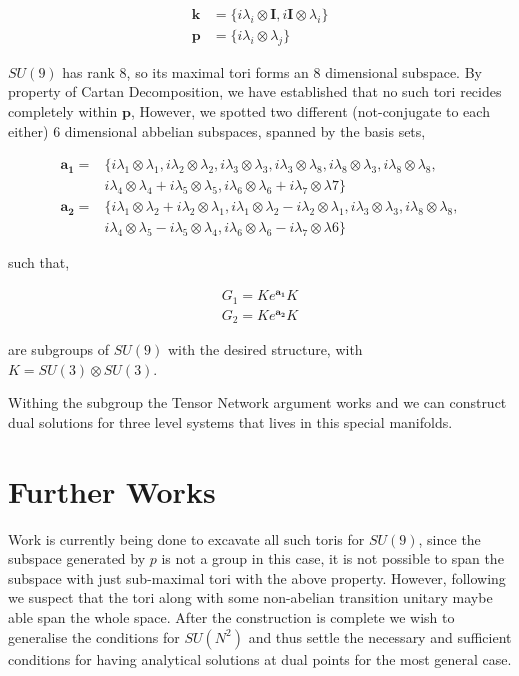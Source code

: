 \documentclass{amsart}
\begin{document}
\begin{align*}
    \mathbf{k}&=\{i \lambda_i \otimes \mathbf{I}, i \mathbf{I} \otimes\lambda_i \}\\
    \mathbf{p}&=\{i \lambda_i \otimes \lambda_j \}
\end{align*}

$SU(9)$ has rank 8, so its maximal tori forms an 8 dimensional subspace. By property of Cartan Decomposition, we have established that no such tori recides completely within $\mathbf{p}$, However, we spotted two different (not-conjugate to each either) 6 dimensional abbelian subspaces, spanned by the basis sets,

\begin{align*}
    \mathbf{a_1}=&\{i \lambda_1 \otimes \lambda_1 ,i \lambda_2 \otimes \lambda_2 ,i \lambda_3 \otimes \lambda_3 , i \lambda_3 \otimes \lambda_8, i \lambda_8 \otimes \lambda_3 , i \lambda_8 \otimes \lambda_8 ,
    \\&i \lambda_4 \otimes \lambda_4 +i \lambda_5 \otimes \lambda_5 ,i \lambda_6 \otimes \lambda_6 +i \lambda_7 \otimes \lambda7  \} \\
    \mathbf{a_2}=&\{i \lambda_1 \otimes \lambda_2+i \lambda_2 \otimes \lambda_1 , i \lambda_1 \otimes \lambda_2 -i \lambda_2 \otimes \lambda_1,i \lambda_3 \otimes \lambda_3 , i \lambda_8 \otimes \lambda_8 ,\\&
    i \lambda_4 \otimes \lambda_5 -i \lambda_5 \otimes \lambda_4 ,i \lambda_6 \otimes \lambda_6 -i \lambda_7 \otimes \lambda6  \} 
\end{align*}

such that,

\begin{align*}
    G_1=K e^{\mathbf{a_1}}K \\ G_2=K e^{\mathbf{a_2}}K
\end{align*}

are subgroups of $SU(9)$ with the desired structure, with $K=SU(3)\otimes SU(3)$.

Withing the subgroup the Tensor Network argument works and we can construct dual solutions for three level systems that lives in this special manifolds. 

\section{Further Works}
Work is currently being done to excavate all such toris for $SU(9)$, since the subspace generated by $p$ is not a group in this case, it is not possible to span the subspace with just sub-maximal tori with the above property. However, following \cite{KhanejaGlasser} we suspect that the tori along with some non-abelian transition unitary maybe able span the whole space. After the construction is complete we wish to generalise the conditions for $SU(N^2)$ and thus settle the necessary and sufficient conditions for having analytical solutions at dual points for the most general case. 

%
%


\printbibliography
\end{document}
